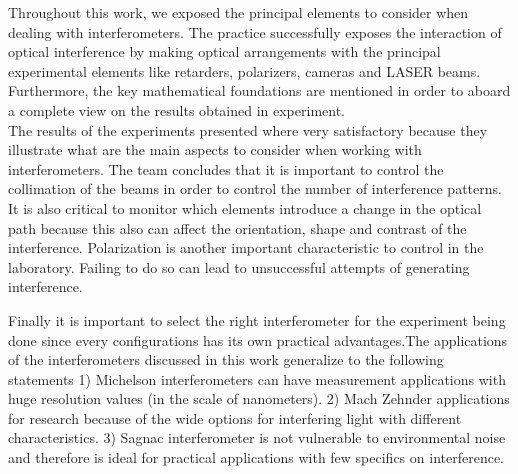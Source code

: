 Throughout this work, we exposed the principal elements to consider when dealing with interferometers. The practice successfully exposes the interaction of optical interference by making optical arrangements with the principal experimental elements like retarders, polarizers, cameras and LASER beams. Furthermore, the key mathematical foundations are mentioned in order to aboard a complete view on the results obtained in experiment. \\

The results of the experiments presented where very satisfactory because they illustrate what are the main aspects to consider when working with interferometers. The team concludes that it is important to control the collimation of the beams in order to control the number of interference patterns. It is also critical to monitor which elements introduce a change in the optical path because this also can affect the orientation, shape and contrast of the interference. Polarization is another important characteristic to control in the laboratory. Failing to do so can lead to unsuccessful attempts of generating interference. 

Finally it is important to select the right interferometer for the experiment being done since every configurations has its own practical advantages.The applications of the interferometers discussed in this work generalize to the following statements 1) Michelson interferometers can have measurement applications with huge resolution values (in the scale of nanometers). 2) Mach Zehnder applications for research because of the wide options for interfering light with different characteristics. 3) Sagnac interferometer is not vulnerable to environmental noise and therefore is ideal for practical applications with few specifics on interference. 
